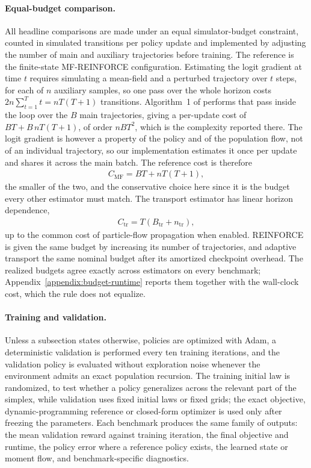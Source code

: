 \paragraph{Equal-budget comparison.}
All headline comparisons are made under an equal simulator-budget constraint, counted in simulated transitions per policy update and implemented by adjusting the number of main and auxiliary trajectories before training. The reference is the finite-state MF-REINFORCE configuration. Estimating the logit gradient at time $t$ requires simulating a mean-field and a perturbed trajectory over $t$ steps, for each of $n$ auxiliary samples, so one pass over the whole horizon costs $2n\sum_{t=1}^{T}t=nT(T+1)$ transitions. Algorithm~1 of \cite{meunier2026model} performs that pass inside the loop over the $B$ main trajectories, giving a per-update cost of $BT+B\,nT(T+1)$, of order $nBT^2$, which is the complexity reported there. The logit gradient is however a property of the policy and of the population flow, not of an individual trajectory, so our implementation estimates it once per update and shares it across the main batch. The reference cost is therefore
\begin{align}
    C_{\mathrm{MF}}
    =
    BT
    +
    nT(T+1),
    \label{eq:mf-reference-cost}
\end{align}
the smaller of the two, and the conservative choice here since it is the budget every other estimator must match. The transport estimator has linear horizon dependence,
\begin{align}
    C_{\mathrm{tr}}
    =
    T(B_{\mathrm{tr}}+n_{\mathrm{tr}}),
    \label{eq:transport-cost}
\end{align}
up to the common cost of particle-flow propagation when enabled. REINFORCE is given the same budget by increasing its number of trajectories, and adaptive transport the same nominal budget after its amortized checkpoint overhead. The realized budgets agree exactly across estimators on every benchmark; Appendix~\ref{appendix:budget-runtime} reports them together with the wall-clock cost, which the rule does not equalize.

\paragraph{Training and validation.}
Unless a subsection states otherwise, policies are optimized with Adam, a deterministic validation is performed every ten training iterations, and the validation policy is evaluated without exploration noise whenever the environment admits an exact population recursion. The training initial law is randomized, to test whether a policy generalizes across the relevant part of the simplex, while validation uses fixed initial laws or fixed grids; the exact objective, dynamic-programming reference or closed-form optimizer is used only after freezing the parameters. Each benchmark produces the same family of outputs: the mean validation reward against training iteration, the final objective and runtime, the policy error where a reference policy exists, the learned state or moment flow, and benchmark-specific diagnostics.

